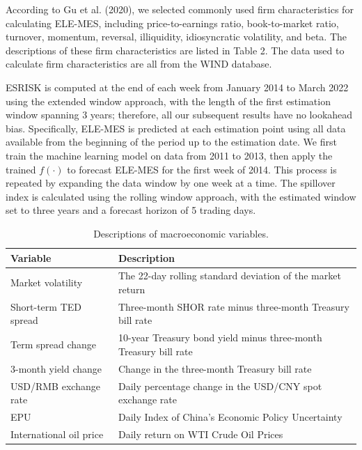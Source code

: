 \documentclass[12pt,a4paper]{article}
\begin{document}
    According to Gu et al. (2020), we selected commonly used firm characteristics for calculating ELE-MES, including price-to-earnings ratio, book-to-market ratio, turnover, momentum, reversal, illiquidity, idiosyncratic volatility, and beta. The descriptions of these firm characteristics are listed in Table 2. The data used to calculate firm characteristics are all from the WIND database.

    ESRISK is computed at the end of each week from January 2014 to March 2022 using the extended window approach, with the length of the first estimation window spanning 3 years; therefore, all our subsequent results have no lookahead bias. Specifically, ELE-MES is predicted at each estimation point using all data available from the beginning of the period up to the estimation date. We first train the machine learning model on data from 2011 to 2013, then apply the trained $f(\cdot)$ to forecast ELE-MES for the first week of 2014. This process is repeated by expanding the data window by one week at a time. The spillover index is calculated using the rolling window approach, with the estimated window set to three years and a forecast horizon of 5 trading days.

    \begin{table}[H]
    \centering
    \caption{Descriptions of macroeconomic variables.}
    \begin{tabular}{ll}
    \toprule
    Variable & Description \\
    \midrule
    Market volatility & The 22-day rolling standard deviation of the market return \\
    Short-term TED spread & Three-month SHOR rate minus three-month Treasury bill rate \\
    Term spread change & 10-year Treasury bond yield minus three-month Treasury bill rate \\
    3-month yield change & Change in the three-month Treasury bill rate \\
    USD/RMB exchange rate & Daily percentage change in the USD/CNY spot exchange rate \\
    EPU & Daily Index of China's Economic Policy Uncertainty \\
    International oil price & Daily return on WTI Crude Oil Prices \\
    \bottomrule
    \end{tabular}
    \end{table}
\end{document}
